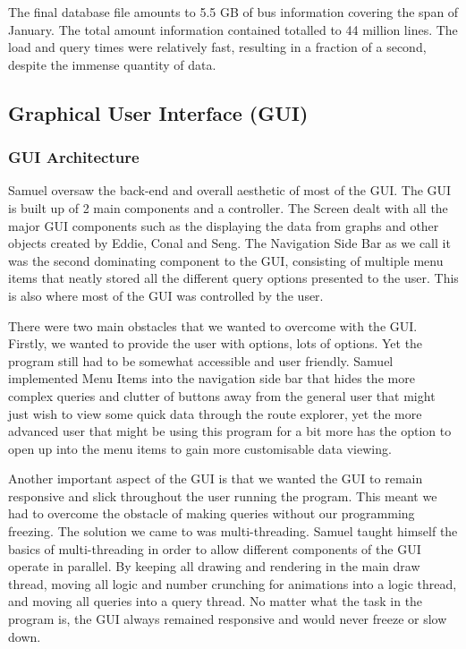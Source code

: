 \documentclass[]{article}
\begin{document}
	The final database file amounts to 5.5 GB of bus information covering the span of January. The total amount information contained totalled to 44 million lines. The load and query times were relatively fast, resulting in a fraction of a second, despite the immense quantity of data.
	
	\subsection{Graphical User Interface (GUI)}
	
	\subsubsection{GUI Architecture}
	
	Samuel oversaw the back-end and overall aesthetic of most of the GUI. The GUI is built up of 2 main components and a controller. The Screen dealt with all the major GUI components such as the displaying the data from graphs and other objects created by Eddie, Conal and Seng. The Navigation Side Bar as we call it was the second dominating component to the GUI, consisting of multiple menu items that neatly stored all the different query options presented to the user. This is also where most of the GUI was controlled by the user.
	
	There were two main obstacles that we wanted to overcome with the GUI. Firstly, we wanted to provide the user with options, lots of options. Yet the program still had to be somewhat accessible and user friendly. Samuel implemented Menu Items into the navigation side bar that hides the more complex queries and clutter of buttons away from the general user that might just wish to view some quick data through the route explorer, yet the more advanced user that might be using this program for a bit more has the option to open up into the menu items to gain more customisable data viewing.	
	
	Another important aspect of the GUI is that we wanted the GUI to remain responsive and slick throughout the user running the program. This meant we had to overcome the obstacle of making queries without our programming freezing. The solution we came to was multi-threading. Samuel taught himself the basics of multi-threading in order to allow different components of the GUI operate in parallel. By keeping all drawing and rendering in the main draw thread, moving all logic and number crunching for animations into a logic thread, and moving all queries into a query thread. No matter what the task in the program is, the GUI always remained responsive and would never freeze or slow down.
	
\end{document}
